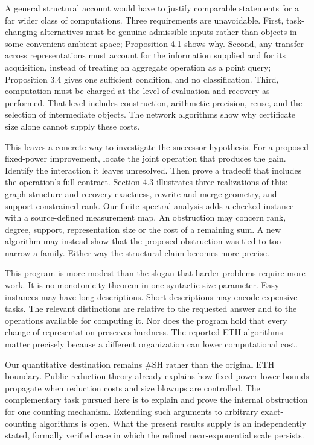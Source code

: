 \documentclass[11pt,letterpaper]{article}
\begin{document}
A general structural account would have to justify comparable statements
for a far wider class of computations. Three requirements are
unavoidable. First, task-changing alternatives must be genuine
admissible inputs rather than objects in some convenient ambient space;
Proposition 4.1 shows why. Second, any transfer across representations
must account for the information supplied and for its acquisition,
instead of treating an aggregate operation as a point query; Proposition
3.4 gives one sufficient condition, and no classification. Third,
computation must be charged at the level of evaluation and recovery as
performed. That level includes construction, arithmetic precision,
reuse, and the selection of intermediate objects. The network algorithms
show why certificate size alone cannot supply these costs.

This leaves a concrete way to investigate the successor hypothesis. For
a proposed fixed-power improvement, locate the joint operation that
produces the gain. Identify the interaction it leaves unresolved. Then
prove a tradeoff that includes the operation's full contract. Section
4.3 illustrates three realizations of this: graph structure and recovery
exactness, rewrite-and-merge geometry, and support-constrained rank. Our
finite spectral analysis adds a checked instance with a source-defined
measurement map. An obstruction may concern rank, degree, support,
representation size or the cost of a remaining sum. A new algorithm may
instead show that the proposed obstruction was tied to too narrow a
family. Either way the structural claim becomes more precise.

This program is more modest than the slogan that harder problems require
more work. It is no monotonicity theorem in one syntactic size
parameter. Easy instances may have long descriptions. Short descriptions
may encode expensive tasks. The relevant distinctions are relative to
the requested answer and to the operations available for computing it.
Nor does the program hold that every change of representation preserves
hardness. The reported ETH algorithms matter precisely because a
different organization can lower computational cost.

Our quantitative destination remains \#SH rather than the original ETH
boundary. Public reduction theory \citep{SH26} already explains how
fixed-power lower bounds propagate when reduction costs and size blowups
are controlled. The complementary task pursued here is to explain and
prove the internal obstruction for one counting mechanism. Extending
such arguments to arbitrary exact-counting algorithms is open. What the
present results supply is an independently stated, formally verified
case in which the refined near-exponential scale persists.
\end{document}
